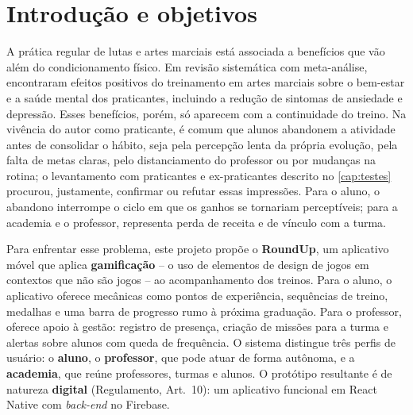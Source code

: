 %

\chapter{Introdução e objetivos}
\label{cap:introducao}

A prática regular de lutas e artes marciais está associada a benefícios
que vão além do condicionamento físico. Em revisão sistemática com
meta-análise,  encontraram efeitos positivos do
treinamento em artes marciais sobre o bem-estar e a saúde mental dos
praticantes, incluindo a redução de sintomas de ansiedade e depressão.
Esses benefícios, porém, só aparecem com a continuidade do treino. Na
vivência do autor como praticante, é comum que alunos abandonem a
atividade antes de consolidar o hábito, seja pela percepção lenta da
própria evolução, pela falta de metas claras, pelo distanciamento do
professor ou por mudanças na rotina; o levantamento com praticantes e
ex-praticantes descrito no \autoref{cap:testes} procurou, justamente,
confirmar ou refutar essas impressões. Para o aluno, o abandono interrompe
o ciclo em que os ganhos se tornariam perceptíveis; para a academia e o
professor, representa perda de receita e de vínculo com a turma.

Para enfrentar esse problema, este projeto propõe o \textbf{RoundUp}, um
aplicativo móvel que aplica \textbf{gamificação} -- o uso de elementos de
design de jogos em contextos que não são jogos \cite{deterding2011} -- ao
acompanhamento dos treinos. Para o aluno, o aplicativo oferece mecânicas
como pontos de experiência, sequências de treino, medalhas e uma barra de
progresso rumo à próxima graduação. Para o professor, oferece apoio à
gestão: registro de presença, criação de missões para a turma e alertas
sobre alunos com queda de frequência. O sistema distingue três perfis de
usuário: o \textbf{aluno}, o \textbf{professor}, que pode atuar de forma
autônoma, e a \textbf{academia}, que reúne professores, turmas e alunos.
O protótipo resultante é de natureza \textbf{digital} (Regulamento,
Art.~10): um aplicativo funcional em React Native com \textit{back-end}
no Firebase.

